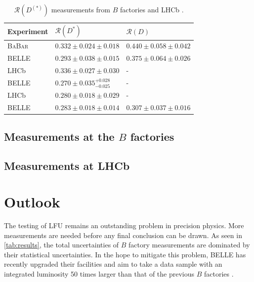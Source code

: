 \documentclass[12pt,letterpaper]{article}
\def\BaBar/{\textsc{BaBar}}
\def\RD/{\ensuremath{\mathcal{R}(D)}}
\def\RDst/{\ensuremath{\mathcal{R}(D^{*})}}
\def\RDDst/{\ensuremath{\mathcal{R}(D^{(*)})}}
\begin{document}
\begin{table}[ht]
    \centering
    \begin{tabular}{lll}
        \toprule
        Experiment  &  \RDst/                               &  \RD/                         \\
        \midrule
        \BaBar/     &  $0.332 \pm 0.024 \pm 0.018$          &  $0.440 \pm 0.058 \pm 0.042$  \\
        BELLE       &  $0.293 \pm 0.038 \pm 0.015$          &  $0.375 \pm 0.064 \pm 0.026$  \\
        LHCb        &  $0.336 \pm 0.027 \pm 0.030$          &  -                            \\
        BELLE       &  $0.270 \pm 0.035^{+0.028}_{-0.025}$  &  -                            \\
        LHCb        &  $0.280 \pm 0.018 \pm 0.029$          &  -                            \\
        BELLE       &  $0.283 \pm 0.018 \pm 0.014$          &  $0.307 \pm 0.037 \pm 0.016$  \\
        \bottomrule
    \end{tabular}
    \caption{
        \RDDst/ measurements from $B$ factories and LHCb \cite{HFLAV:2019}.
    }
    \label{tab:results}
\end{table}

\subsection{Measurements at the $B$ factories} \label{sec:meas_bfactories}


\subsection{Measurements at LHCb} \label{sec:meas_lhcb}


\section{Outlook}
The testing of LFU remains an outstanding problem in precision
physics.
More measurements are needed before any final conclusion can be drawn.
As seen in \autoref{tab:results}, the total uncertainties of $B$ factory
measurements are dominated by their statistical uncertainties.
In the hope to mitigate this problem, BELLE has recently upgraded their
facilities and aim to take a data sample with an integrated luminosity 50 times
larger than that of the previous $B$ factories \cite{Abe:2010gxa}.
\end{document}
